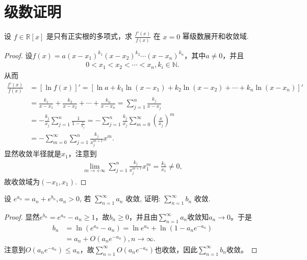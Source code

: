 \documentclass[../../main.tex]{subfiles}%
\begin{document}
\section{级数证明}

\begin{example}
设 $f \in \mathbb{R}[x]$ 是只有正实根的多项式，求 $\frac{f'(x)}{f(x)}$ 在 $x = 0$ 幂级数展开和收敛域.
\end{example}
\begin{proof}
设$f(x) =a(x-x_1)^{k_1}(x-x_2)^{k_2}\cdots(x-x_n)^{k_n}$，其中$a\ne 0$，并且
\begin{align*}
0<x_1<x_2<\cdots <x_n,k_i\in \mathbb{N}.
\end{align*}
从而
\begin{align*}
\frac{f'(x)}{f(x)}&=\left[ \ln f(x) \right]'=\left[ \ln a+k_1\ln(x-x_1)+k_2\ln(x-x_2)+\cdots +k_n\ln(x-x_n) \right]' \\
&=\frac{k_1}{x-x_1}+\frac{k_2}{x-x_2}+\cdots +\frac{k_n}{x-x_n} =\sum\limits_{j=1}^n{\frac{k_j}{x-x_j}}\\
&=-\frac{k_j}{x_j}\sum\limits_{j=1}^n{\frac{1}{1-\frac{x}{x_j}}} =-\sum\limits_{j=1}^n{\frac{k_j}{x_j}\sum\limits_{m=0}^{\infty}{\left( \frac{x}{x_j} \right)^m}}\\
&=-\sum\limits_{m=0}^{\infty}{\sum\limits_{j=1}^n{\frac{k_j}{x_j^{m+1}}}x^m}.
\end{align*}
显然收敛半径就是$x_1$，注意到
\begin{align*}
\lim_{m\rightarrow +\infty}\sum_{j=1}^n{\frac{k_j}{x_j^{m+1}}}x_1^m=\frac{k_1}{x_1}\ne 0,
\end{align*}
故收敛域为$(-x_1,x_1)$.
\end{proof}

\begin{example}
设 $e^{a_n} = a_n + e^{b_n},a_n > 0$, 若 $\sum\limits_{n=1}^{\infty}a_n$ 收敛, 证明: $\sum\limits_{n=1}^{\infty}b_n$ 收敛.
\end{example}
\begin{proof}
显然$e^{b_n}=e^{a_n}-a_n\geqslant 1$，故$b_n\geqslant 0$，并且由$\sum_{n=1}^{\infty}a_n$收敛知$a_n\rightarrow 0$。于是
\begin{align*}
b_n&=\ln\left( e^{a_n}-a_n \right)=\ln e^{a_n}+\ln\left( 1-a_ne^{-a_n} \right)\\
&=a_n+O\left( a_ne^{-a_n} \right),n\rightarrow \infty.
\end{align*}
注意到$O\left( a_ne^{-a_n} \right)\leqslant a_n$，故$\sum_{n=1}^{\infty}O\left( a_ne^{-a_n} \right)$也收敛，因此$\sum_{n=1}^{\infty}b_n$收敛。
\end{proof}
\end{document}
